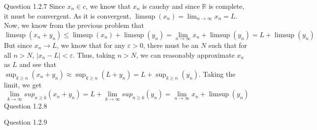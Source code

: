 \documentclass[12pt]{exam}
\begin{document}
\begin{questions}
\question Question 1.2.7\newline
Since $x_n \in c$, we know that $x_n$ is cauchy and since $\mathbb{R}$ is complete, it must be convergent. As it is convergent, $\limsup(x_n) = \lim_{n\rightarrow \infty}x_n = L$.  Now, we know from the previous problem that \[\limsup(x_n+y_n) \leq \limsup(x_n) + \limsup(y_n) =\lim_{n\rightarrow \infty}x_n + \limsup(y_n) = L + \limsup(y_n)\] But since $x_n \rightarrow L$, we know that for any $\varepsilon >0$, there must be an $N$ such that for all $n > N$, $|x_n - L| < \varepsilon$. Thus, taking $n>N$, we can reasonably approximate $x_n$ as $L$ and see that $\sup_{k \geq n}(x_n+y_n) \approx \sup_{k \geq n}(L+y_n) = L + \sup_{k \geq n}(y_n) $. Taking the limit, we get \[\lim_{k\rightarrow \infty}sup_{n\geq k}(x_n+y_n) = L + \lim_{k\rightarrow \infty}sup_{n\geq k}(y_n) =  \lim_{n\rightarrow \infty}x_n + \limsup(y_n)\]
\question Question 1.2.8

\question Question 1.2.9
\begin{parts}

\end{parts}
\end{questions}
\end{document}
